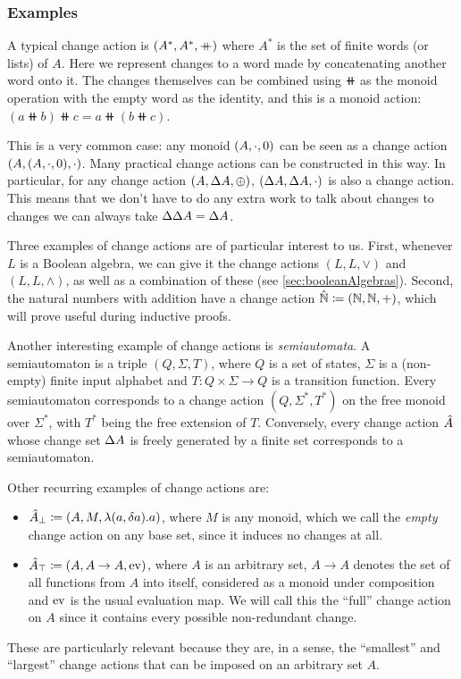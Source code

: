 \subsubsection{Examples}
\label{sec:examples}
A typical change action is $(A^\ast,A^\ast,\mathbin{+\mkern-10mu+})$ where $A^\ast$ is the set of finite words (or lists) of $A$. 
Here we represent changes to a word made by concatenating another word onto it. 
The changes themselves can be combined using $\doubleplus$ as the monoid operation with the empty word as the identity, 
and this is a monoid action: $(a \doubleplus b) \doubleplus c = a \doubleplus \left( b \doubleplus c \right)$.

This is a very common case: any monoid $(A, \cdot, 0)$ can be seen as a change action
$(A,(A, \cdot, 0),\cdot)$. Many practical change actions
can be constructed in this way. In particular, for any change action $(A,\Delta A,\oplus)$,
$(\Delta A,\Delta A,\cdot)$ is also a change action. This means
that we don't have to do any extra work to talk about changes to changes \textemdash{} we can 
always take $\Delta \Delta A = \Delta A$.

Three examples of change actions are of particular interest to us.
First, whenever
$L$ is a Boolean algebra, we can give it the change actions $(L, L, \vee)$ and $(L, L, \wedge)$, 
as well as a combination of these (see \cref{sec:booleanAlgebras}). Second,
the natural numbers with addition have a change action $\hat{\mathbb{N}} \coloneqq (\mathbb{N},
\mathbb{N}, +)$, which will prove useful during inductive proofs.
 
Another interesting example of change actions is \textit{semiautomata}. A semiautomaton is a triple
$(Q, \Sigma, T)$, where $Q$ is a set of states, $\Sigma$ is a (non-empty) finite input alphabet
and $T : Q \times \Sigma \rightarrow Q$ is a transition function. 
Every semiautomaton corresponds to a change action $(Q, \Sigma^*, T^*)$ on the free monoid
over $\Sigma^*$, with $T^*$ being the free extension of $T$. Conversely, every change action $\hat{A}$
whose change set $\Delta A$ is freely generated by a finite set corresponds to a semiautomaton.

Other recurring examples of change actions are:
\begin{itemize}
  \item $\hat{A}_\bot \coloneqq (A,M,\lambda(a, \delta a). a)$, where $M$ is any monoid,
    which we call the \emph{empty} change action on any base set, since it induces no changes at all.
  \item $\hat{A}_\top \coloneqq (A,A \rightarrow A,\operatorname{ev})$, where $A$ is an arbitrary
    set, $A \rightarrow A$ denotes the set of all functions from $A$ into itself, considered as
    a monoid under composition and $\operatorname{ev}$ is the usual evaluation map. We will call this the
    ``full'' change action on $A$ since it contains every possible non-redundant change.
\end{itemize}
These are particularly relevant because they are, in a sense, the ``smallest'' and ``largest''
change actions that can be imposed on an arbitrary set $A$.

